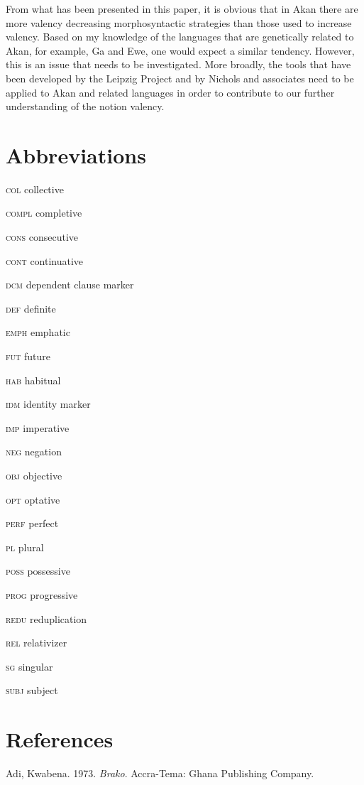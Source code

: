 \documentclass[output=paper]{langsci/langscibook}
\begin{document}
From what has been presented in this paper, it is obvious that in Akan there are more valency decreasing morphosyntactic strategies than those used to increase valency. Based on my knowledge of the languages that are genetically related to Akan, for example, Ga and Ewe, one would expect a similar tendency. However, this is an issue that needs to be investigated. More broadly, the tools that have been developed by the Leipzig Project and by Nichols and associates need to be applied to Akan and related languages in order to contribute to our further understanding of the notion valency.

\section{Abbreviations}

\textsc{col}   collective

\textsc{compl}  completive

\textsc{cons}  consecutive

\textsc{cont}  continuative

\textsc{dcm}   dependent clause marker

\textsc{def}   definite

\textsc{emph}  emphatic

\textsc{fut}  future

\textsc{hab}  habitual

\textsc{idm}  identity marker

\textsc{imp}  imperative

\textsc{neg}  negation

\textsc{obj}  objective

\textsc{opt}  optative

\textsc{perf}  perfect

\textsc{pl}  plural

\textsc{poss}  possessive

\textsc{prog}  progressive

\textsc{redu}  reduplication

\textsc{rel  }relativizer

\textsc{sg  }singular

\textsc{subj  }subject

\section{References}

Adi, Kwabena. 1973. \emph{Brako}. Accra-Tema: Ghana Publishing Company.
\end{document}

